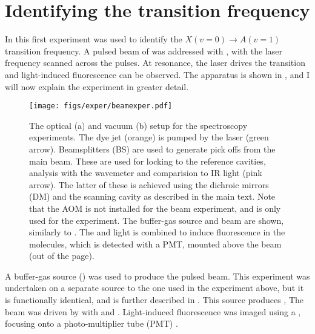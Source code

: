 \section{Identifying the transition frequency}

In this first experiment  was used to identify the $X(v=0)
\rightarrow A(v=1)$ transition frequency. A pulsed beam of \CaF{} was addressed
with , with the laser frequency scanned across the pulses. At
resonance, the laser drives the transition and light-induced fluorescence can
be observed. The apparatus is shown in , and I will
now explain the experiment in greater detail.

\begin{figure}
  \centering
  \texttt{[image: figs/exper/beamexper.pdf]}
  \caption{The optical (a) and vacuum (b) setup for the spectroscopy
    experiments. The dye jet (orange) is pumped by the  laser (green
    arrow). Beamsplitters (BS) are used to generate pick offs from the main
    beam. These are used for locking
    to the reference cavities, analysis with the wavemeter and comparision to
    IR light (pink arrow). The latter of these is achieved using the dichroic
    mirrors (DM) and  the scanning cavity as described in the main text. Note
    that the AOM is not installed for the beam experiment, and is
    only used for the  experiment. The buffer-gas source and \CaF{}
    beam are shown, similarly to . The
     and  light is combined to induce fluorescence in
    the molecules, which is detected with a PMT, mounted above the beam (out of
    the page).
  }
  \label{exper:fig:beamapp} 
\end{figure}


A buffer-gas source () was used to produce the pulsed \CaF{}
beam.  This experiment was undertaken on a separate \CaF{} source to the one
used in the experiment above, but it is functionally identical, and is further
described in . This source produces ,  The beam was driven by  with  and
. Light-induced fluorescence was imaged using a , focusing onto a photo-multiplier tube (PMT) .

